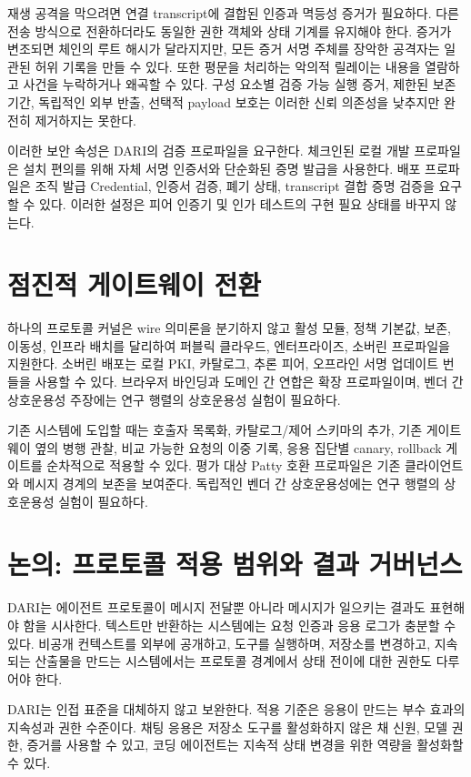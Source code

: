 \documentclass[10pt]{article}
\begin{document}
재생 공격을 막으려면 연결 transcript에 결합된 인증과 멱등성 증거가 필요하다. 다른 전송 방식으로 전환하더라도 동일한 권한 객체와 상태 기계를 유지해야 한다. 증거가 변조되면 체인의 루트 해시가 달라지지만, 모든 증거 서명 주체를 장악한 공격자는 일관된 허위 기록을 만들 수 있다. 또한 평문을 처리하는 악의적 릴레이는 내용을 열람하고 사건을 누락하거나 왜곡할 수 있다. 구성 요소별 검증 가능 실행 증거, 제한된 보존 기간, 독립적인 외부 반출, 선택적 payload 보호는 이러한 신뢰 의존성을 낮추지만 완전히 제거하지는 못한다.

이러한 보안 속성은 DARI의 검증 프로파일을 요구한다. 체크인된 로컬 개발 프로파일은 설치 편의를 위해 자체 서명 인증서와 단순화된 증명 발급을 사용한다. 배포 프로파일은 조직 발급 Credential, 인증서 검증, 폐기 상태, transcript 결합 증명 검증을 요구할 수 있다. 이러한 설정은 피어 인증기 및 인가 테스트의 구현 필요 상태를 바꾸지 않는다.

\section{점진적 게이트웨이 전환}

하나의 프로토콜 커널은 wire 의미론을 분기하지 않고 활성 모듈, 정책 기본값, 보존, 이동성, 인프라 배치를 달리하여 퍼블릭 클라우드, 엔터프라이즈, 소버린 프로파일을 지원한다. 소버린 배포는 로컬 PKI, 카탈로그, 추론 피어, 오프라인 서명 업데이트 번들을 사용할 수 있다. 브라우저 바인딩과 도메인 간 연합은 확장 프로파일이며, 벤더 간 상호운용성 주장에는 연구 행렬의 상호운용성 실험이 필요하다.

기존 시스템에 도입할 때는 호출자 목록화, 카탈로그/제어 스키마의 추가, 기존 게이트웨이 옆의 병행 관찰, 비교 가능한 요청의 이중 기록, 응용 집단별 canary, rollback 게이트를 순차적으로 적용할 수 있다. 평가 대상 Patty 호환 프로파일은 기존 클라이언트와 메시지 경계의 보존을 보여준다. 독립적인 벤더 간 상호운용성에는 연구 행렬의 상호운용성 실험이 필요하다.

\section{논의: 프로토콜 적용 범위와 결과 거버넌스}

DARI는 에이전트 프로토콜이 메시지 전달뿐 아니라 메시지가 일으키는 결과도 표현해야 함을 시사한다. 텍스트만 반환하는 시스템에는 요청 인증과 응용 로그가 충분할 수 있다. 비공개 컨텍스트를 외부에 공개하고, 도구를 실행하며, 저장소를 변경하고, 지속되는 산출물을 만드는 시스템에서는 프로토콜 경계에서 상태 전이에 대한 권한도 다루어야 한다.

DARI는 인접 표준을 대체하지 않고 보완한다. 적용 기준은 응용이 만드는 부수 효과의 지속성과 권한 수준이다. 채팅 응용은 저장소 도구를 활성화하지 않은 채 신원, 모델 권한, 증거를 사용할 수 있고, 코딩 에이전트는 지속적 상태 변경을 위한 역량을 활성화할 수 있다.
\end{document}
